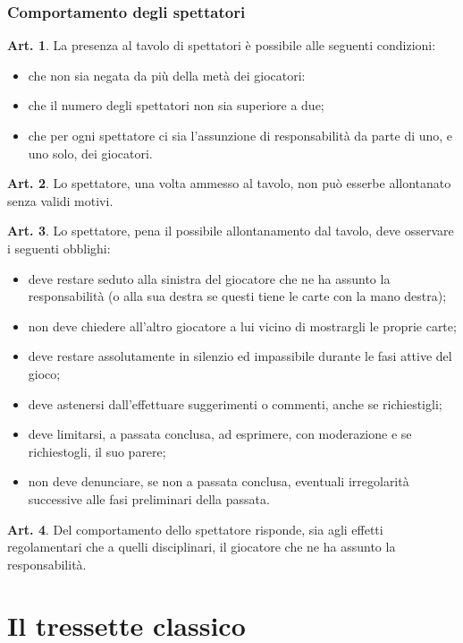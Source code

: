 \documentclass[italian,a4paper]{book}
\theoremstyle{definition}
\newtheorem{art}{Art.}
\newenvironment{packeditem}{
\begin{itemize}
  \setlength{\itemsep}{1pt}
  \setlength{\parskip}{0pt}
  \setlength{\parsep}{0pt}
}{\end{itemize}}
\begin{document}
\subsection{Comportamento degli spettatori}
\begin{art}
    La presenza al tavolo di spettatori è possibile alle seguenti condizioni:
    \begin{packeditem}
\item      che non sia negata da più della metà dei giocatori:
\item      che il numero degli spettatori non sia superiore a due;
\item      che per ogni spettatore ci sia l'assunzione di responsabilità da parte di uno, e uno solo, dei giocatori.
    \end{packeditem}
\end{art}
\begin{art}
    Lo spettatore, una volta ammesso al tavolo, non può esserbe allontanato senza validi motivi.
\end{art}
\begin{art}
    Lo spettatore, pena il possibile allontanamento dal tavolo, deve osservare i seguenti obblighi:
    \begin{packeditem}
\item      deve restare seduto alla sinistra del giocatore che ne ha assunto la responsabilità (o alla sua destra se questi tiene le carte con la mano destra);
\item      non deve chiedere all'altro giocatore a lui vicino di mostrargli le proprie carte;
\item      deve restare assolutamente in silenzio ed impassibile durante le fasi attive del gioco;
\item      deve astenersi dall'effettuare suggerimenti o commenti, anche se richiestigli;
\item      deve limitarsi, a passata conclusa, ad esprimere, con moderazione e se richiestogli, il suo parere;
\item        non deve denunciare, se non a passata conclusa, eventuali irregolarità successive alle fasi preliminari della passata.
    \end{packeditem}
\end{art}
\begin{art}
    Del comportamento dello spettatore risponde, sia agli effetti regolamentari che a quelli disciplinari, il giocatore che ne ha assunto la responsabilità.
\end{art}
\chapter{Il tressette classico}
\end{document}
